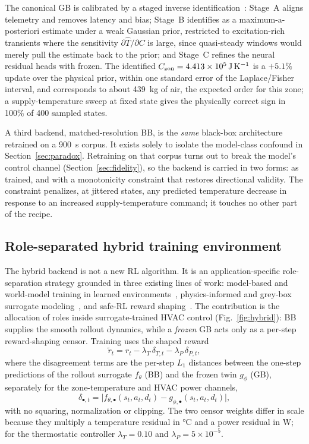 The canonical GB is calibrated by a staged inverse
identification~\cite{Bacher2011RCIdentification}: Stage~A aligns telemetry and removes latency and
bias; Stage~B identifies \Czon{} as a maximum-a-posteriori estimate under a weak Gaussian prior,
restricted to excitation-rich transients where the sensitivity $\partial\widehat{T}/\partial C$ is
large, since quasi-steady windows would merely pull the estimate back to the prior; and Stage~C
refines the neural residual heads with \Czon{} frozen. The identified
$C_{\mathrm{zon}}=\SI{4.413e5}{\joule\per\kelvin}$ is a $+5.1\%$ update over the physical prior, within one
standard error of the Laplace/Fisher interval, and corresponds to about \SI{439}{\kilogram} of air,
the expected order for this zone; a supply-temperature sweep at fixed state gives the physically
correct sign in 100\% of 400 sampled states.

A third backend, matched-resolution BB, is the \emph{same} black-box architecture retrained on a
\SI{900}{\second} corpus. It exists solely to isolate the model-class confound in
Section~\ref{sec:paradox}. Retraining on that corpus turns out to break the model's control channel
(Section~\ref{sec:fidelity}), so the backend is carried in two forms: as trained, and with a
monotonicity constraint that restores directional validity. The constraint penalizes, at jittered
states, any predicted temperature decrease in response to an increased supply-temperature command;
it touches no other part of the recipe.

\subsection{Role-separated hybrid training environment}\label{ssec:hybrid}
The hybrid backend is not a new RL algorithm. It is an application-specific role-separation strategy
grounded in three existing lines of work: model-based and world-model training in learned
environments~\cite{Sutton1991Dyna,Hafner2025Dreamer}, physics-informed and grey-box surrogate
modeling~\cite{Bacher2011RCIdentification,Raissi2019PINN,Willard2022PIML}, and safe-RL reward
shaping~\cite{Garcia2015SafeRL,Wang2025SafeDRL}. The contribution is the allocation of roles inside
surrogate-trained HVAC control (Fig.~\ref{fig:hybrid}): BB supplies the smooth rollout dynamics,
while a \emph{frozen} GB acts only as a per-step reward-shaping censor. Training uses the shaped
reward
\begin{equation}
\tilde{r}_t=r_t-\lambda_T\,\delta_{T,t}-\lambda_P\,\delta_{P,t},
\label{eq:hybrid}
\end{equation}
where the disagreement terms are the per-step $L_1$ distances between the one-step predictions of
the rollout surrogate $f_\theta$ (BB) and the frozen twin $g_\phi$ (GB), separately for the
zone-temperature and HVAC power channels,
\begin{equation*}
\delta_{\bullet,t}=\big|f_{\theta,\bullet}(s_t,a_t,d_t)-g_{\phi,\bullet}(s_t,a_t,d_t)\big|,
\end{equation*}
with no squaring, normalization or clipping. The two censor weights differ in scale because they
multiply a temperature residual in \si{\celsius} and a power residual in \si{\watt}; for the
thermostatic controller $\lambda_T=0.10$ and $\lambda_P=5\times10^{-5}$.

